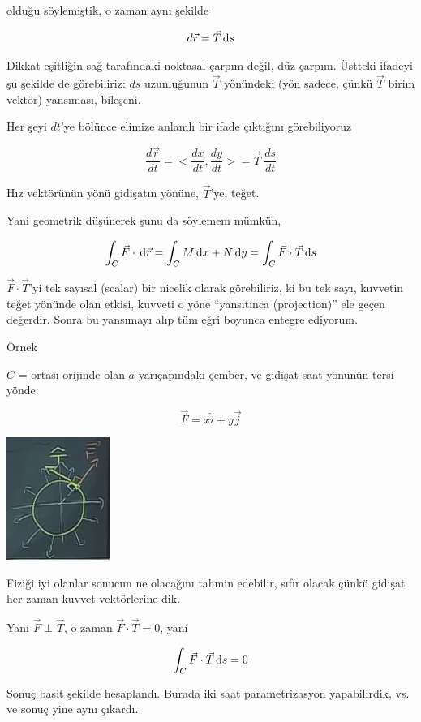 \documentclass[12pt,fleqn]{article}\usepackage{../../common}
\begin{document}
olduğu söylemiştik, o zaman aynı şekilde

$$  d\vec{r} = \vec{T} \,\mathrm{d} s $$

Dikkat eşitliğin sağ tarafındaki noktasal çarpım değil, düz çarpım. Üstteki
ifadeyi şu şekilde de görebiliriz: $ds$ uzunluğunun $\vec{T}$ yönündeki
(yön sadece, çünkü $\vec{T}$ birim vektör) yansıması, bileşeni.

Her şeyi $dt$'ye bölünce elimize anlamlı bir ifade çıktığını görebiliyoruz

$$ \frac{d\vec{r}}{dt} = <\frac{dx}{dt}, \frac{dy}{dt}> 
= \vec{T} \ \frac{ds}{dt} 
$$

Hız vektörünün yönü gidişatın yönüne, $\vec{T}$'ye, teğet.

Yani geometrik düşünerek şunu da söylemem mümkün,

$$
\int_C \vec{F} \cdot \,\mathrm{d}\vec{r}  = \int_C M \,\mathrm{d} x + N \,\mathrm{d} y
= \int_C \vec{F} \cdot \vec{T} \,\mathrm{d} s
$$

$\vec{F} \cdot \vec{T}$'yi tek sayısal (scalar) bir nicelik olarak görebiliriz,
ki bu tek sayı, kuvvetin teğet yönünde olan etkisi, kuvveti o yöne ``yansıtınca
(projection)'' ele geçen değerdir. Sonra bu yansımayı alıp tüm eğri boyunca
entegre ediyorum.

Örnek

$C$ = ortası orijinde olan $a$ yarıçapındaki çember, ve gidişat saat
yönünün tersi yönde.

$$ \vec{F} = x\hat{i} + y\vec{j} $$

\begin{center}
\includegraphics[height=4cm]{19_13.png}
\end{center}

Fiziği iyi olanlar sonucun ne olacağını tahmin edebilir, sıfır olacak çünkü
gidişat her zaman kuvvet vektörlerine dik. 

Yani $\vec{F} \perp \vec{T}$, o zaman $\vec{F} \cdot \vec{T} = 0$, yani

$$  \int_C \vec{F} \cdot \vec{T} \,\mathrm{d} s = 0$$

Sonuç basit şekilde hesaplandı. Burada iki saat parametrizasyon
yapabilirdik, vs. ve sonuç yine aynı çıkardı. 
\end{document}
